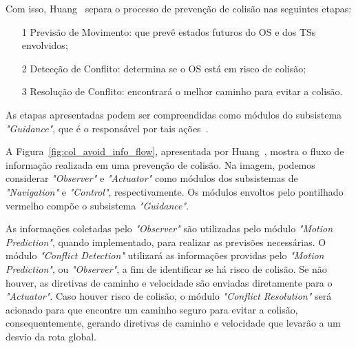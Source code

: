         Com isso, Huang\etal~\cite{HUANG2020451} separa o processo de prevenção de colisão nas seguintes etapas: 
        
        \begin{enumerate}
            \item [1] Previsão de Movimento: que prevê estados futuros do OS e dos TSs envolvidos;
            \item [2] Detecção de Conflito: determina se o OS está em risco de colisão;
            \item [3] Resolução de Conflito: encontrará o melhor caminho para evitar a colisão.
        \end{enumerate}
        
        
        As etapas apresentadas podem ser compreendidas como módulos do subsistema \textit{"Guidance"}, que é o responsável por tais ações~\cite{JURAK2020}.
        
        A Figura~\ref{fig:col_avoid_info_flow}, apresentada por Huang\etal~\cite{HUANG2020451}, mostra o fluxo de informação realizada em uma prevenção de colisão. Na imagem, podemos considerar \textit{"Observer"} e \textit{"Actuator"} como módulos dos subsistemas de \textit{"Navigation"} e \textit{"Control"}, respectivamente. Os módulos envoltos pelo pontilhado vermelho compõe o subsistema \textit{"Guidance"}. 
        
        As informações coletadas pelo \textit{"Observer"} são utilizadas pelo módulo \textit{"Motion Prediction"}, quando implementado, para realizar as previsões necessárias. O módulo \textit{"Conflict Detection"} utilizará as informações providas pelo \textit{"Motion Prediction"}, ou \textit{"Observer"}, a fim de identificar se há risco de colisão. Se não houver, as diretivas de caminho e velocidade são enviadas diretamente para o \textit{"Actuator"}. Caso houver risco de colisão, o módulo \textit{"Conflict Resolution"} será acionado para que encontre um caminho seguro para evitar a colisão, consequentemente, gerando diretivas de caminho e velocidade que levarão a um desvio da rota global.
        
